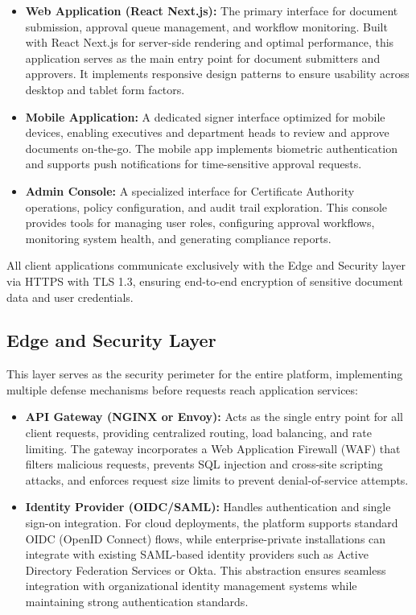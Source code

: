 \documentclass[12pt,oneside,openright,a4paper]{cpe-english-project}
\begin{document}
\begin{itemize}
\item \textbf{Web Application (React Next.js):} The primary interface for document submission, approval queue management, and workflow monitoring. Built with React Next.js for server-side rendering and optimal performance, this application serves as the main entry point for document submitters and approvers. It implements responsive design patterns to ensure usability across desktop and tablet form factors.

\item \textbf{Mobile Application:} A dedicated signer interface optimized for mobile devices, enabling executives and department heads to review and approve documents on-the-go. The mobile app implements biometric authentication and supports push notifications for time-sensitive approval requests.

\item \textbf{Admin Console:} A specialized interface for Certificate Authority operations, policy configuration, and audit trail exploration. This console provides tools for managing user roles, configuring approval workflows, monitoring system health, and generating compliance reports.
\end{itemize}

All client applications communicate exclusively with the Edge and Security layer via HTTPS with TLS 1.3, ensuring end-to-end encryption of sensitive document data and user credentials.

\newpage

\subsection{Edge and Security Layer}

This layer serves as the security perimeter for the entire platform, implementing multiple defense mechanisms before requests reach application services:

\begin{itemize}
\item \textbf{API Gateway (NGINX or Envoy):} Acts as the single entry point for all client requests, providing centralized routing, load balancing, and rate limiting. The gateway incorporates a Web Application Firewall (WAF) that filters malicious requests, prevents SQL injection and cross-site scripting attacks, and enforces request size limits to prevent denial-of-service attempts.

\item \textbf{Identity Provider (OIDC/SAML):} Handles authentication and single sign-on integration. For cloud deployments, the platform supports standard OIDC (OpenID Connect) flows, while enterprise-private installations can integrate with existing SAML-based identity providers such as Active Directory Federation Services or Okta. This abstraction ensures seamless integration with organizational identity management systems while maintaining strong authentication standards.
\end{itemize}
\end{document}
